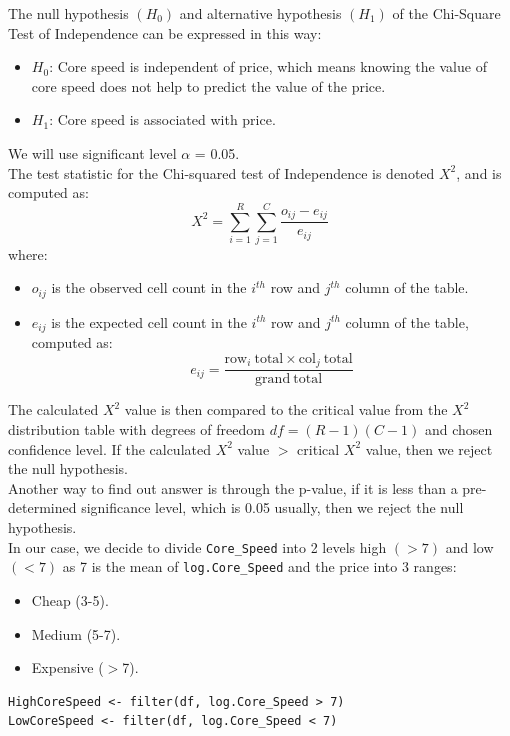\documentclass[a4paper]{article}
\begin{document}
The null hypothesis $(H_0)$ and alternative hypothesis $(H_1)$ of the Chi-Square Test of Independence can be expressed in this way:
\begin{itemize}
    \item $H_0$: Core speed is independent of price, which means knowing the value of core speed does not help to predict the value of the price.
    \item $H_1$: Core speed is associated with price.
\end{itemize}
We will use significant level $\alpha$ = 0.05.\\
The test statistic for the Chi-squared test of Independence is denoted $X^2$, and is computed as:
\begin{equation*}
    X^2= \sum_{i=1}^R \sum_{j=1}^C \dfrac{o_{ij}-e_{ij}}{e_{ij}}
\end{equation*}
where:
\begin{itemize}
    \item $o_{ij}$ is the observed cell count in the $i^{th}$ row and $j^{th}$ column of the table.
    \item $e_{ij}$  is the expected cell count in the $i^{th}$ row and $j^{th}$ column of the table, computed as:
    \begin{equation*}
        e_{ij}=\dfrac{\mathrm{row}_i \mathrm{\:total} \times \mathrm{col}_j \mathrm{\:total}}{\mathrm{grand\:total}}
    \end{equation*}
\end{itemize}
The calculated $X^2$ value is then compared to the critical value from the $X^2$ distribution table with degrees of freedom $df = (R - 1)(C - 1)$ and chosen confidence level. If the calculated $X^2$ value $>$ critical $X^2$ value, then we reject the null hypothesis.\\
Another way to find out answer is through the p-value, if it is less than a pre-determined significance level, which is 0.05 usually, then we reject the null hypothesis.\bigskip\\ 
In our case, we decide to divide \verb|Core_Speed| into 2 levels high $(>7)$ and low $(<7)$ as 7 is the mean of \verb|log.Core_Speed| and the price into 3 ranges:
\begin{itemize}
    \item Cheap (3-5).
    \item Medium (5-7).
    \item Expensive ($>$7).
\end{itemize}
\begin{mdframed}[leftline=false,rightline=false,backgroundcolor=lightblue!10,nobreak=false]
    \begin{verbatim}
HighCoreSpeed <- filter(df, log.Core_Speed > 7)
LowCoreSpeed <- filter(df, log.Core_Speed < 7)
    \end{verbatim}
\end{mdframed}
\end{document}
